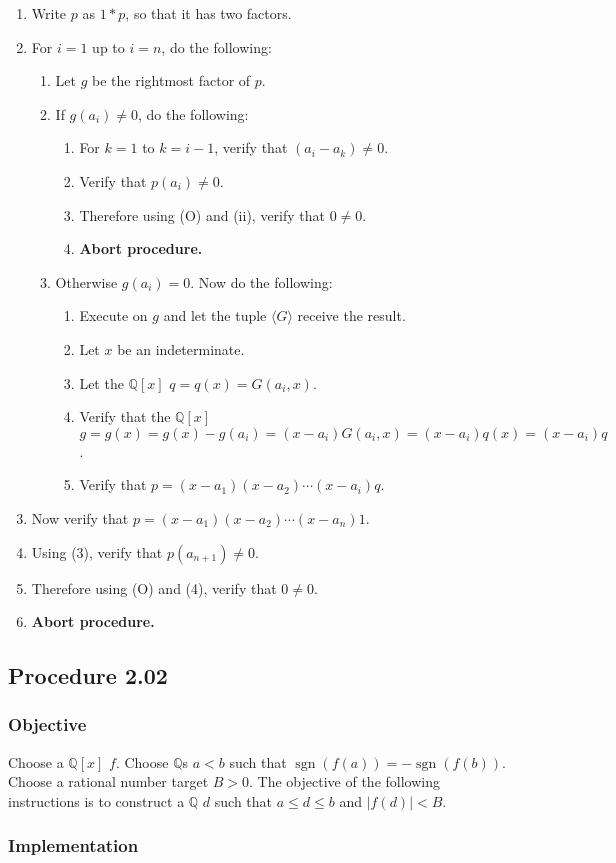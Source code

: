 \documentclass[twocolumn]{article}
\DeclareMathOperator{\sgn}{sgn}
\newcommand{\procedure}[2][]{\subsection*{Procedure #2 \ifthenelse{\equal{#1}{}}{}{(#1)}}\label{sec:procedure #2}}
\newcommand{\objective}{\subsubsection*{Objective}}
\newcommand{\implementation}{\subsubsection*{Implementation}}
\newcommand{\procedurehr}[2][]{\hyperref[sec:procedure #2]{\ifthenelse{\equal{#1}{}}{procedure #2}{#1}}}
\begin{document}
				\begin{enumerate}
					\item Write $p$ as $1*p$, so that it has two factors.
					\item For $i=1$ up to $i=n$, do the following:
					\begin{enumerate}
						\item Let $g$ be the rightmost factor of $p$.
						\item If $g(a_i)\ne 0$, do the following:
						\begin{enumerate}
							\item For $k=1$ to $k=i-1$, verify that $(a_i-a_k)\ne 0$.
							\item Verify that $p(a_i)\ne 0$.
							\item Therefore using (O) and (ii), verify that $0\ne 0$.
							\item \textbf{Abort procedure.}
						\end{enumerate}
						\item Otherwise $g(a_i)=0$. Now do the following:
						\begin{enumerate}
							\item Execute \procedurehr{2.0} on $g$ and let the tuple $\langle G\rangle$ receive the result.
							\item Let $x$ be an indeterminate.
							\item Let the $\mathbb{Q}[x]$ $q=q(x)=G(a_i,x)$.
							\item Verify that the $\mathbb{Q}[x]$ $g=g(x)=g(x)-g(a_i)=(x-a_i)G(a_i,x)=(x-a_i)q(x)=(x-a_i)q$.
							\item Verify that $p=(x-a_1)(x-a_2)\cdots(x-a_i)q$.
						\end{enumerate}
					\end{enumerate}
					\item Now verify that $p=(x-a_1)(x-a_2)\cdots(x-a_n)1$.
					\item Using (3), verify that $p(a_{n+1})\ne 0$.
					\item Therefore using (O) and (4), verify that $0\ne 0$.
					\item \textbf{Abort procedure.}
				\end{enumerate}
		\procedure{2.02}
			\objective
				Choose a $\mathbb{Q}[x]$ $f$. Choose $\mathbb{Q}$s $a<b$ such that $\sgn(f(a))=-\sgn(f(b))$. Choose a rational number target $B>0$. The objective of the following instructions is to construct a $\mathbb{Q}$ $d$ such that $a\le d\le b$ and $\lvert f(d)\rvert<B$.
			\implementation
\end{document}
